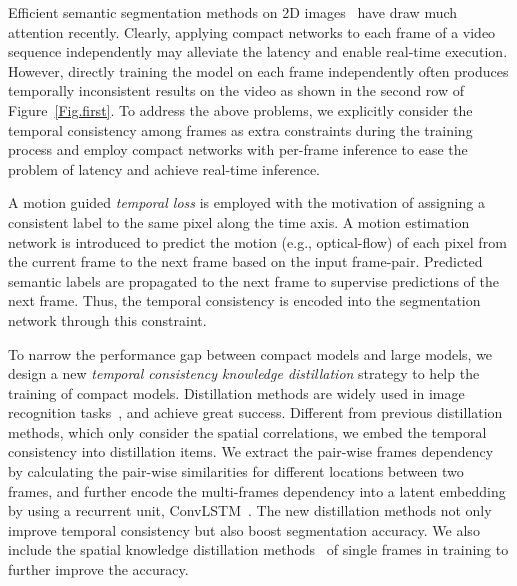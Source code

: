 \documentclass[runningheads]{llncs}
\begin{document}
Efficient semantic segmentation methods on 2D images~\cite{mehta2018espnet,yu2018bisenet,orsic2019defense} have draw much attention recently. Clearly, applying compact networks to each frame of a  video 
sequence independently may alleviate the latency and enable 
real-time execution. However, directly training the model on each frame independently 
often
produces 
temporally 
inconsistent results on the video as shown in the second row of Figure~\ref{Fig.first}. 
To address the above problems, we explicitly consider the temporal consistency among frames as extra constraints during the training process and employ compact networks with per-frame inference to ease the problem of latency and achieve real-time inference. 





A motion guided \textit{temporal loss} is employed with the motivation of assigning a consistent label to the same pixel along the time axis. 
A motion estimation network is introduced to predict the motion (e.g., optical-flow) of each pixel from the current frame to the next frame based on the input frame-pair. Predicted semantic labels are propagated to the next frame to supervise predictions of the next frame. Thus, 
the temporal consistency is encoded into the segmentation network through this constraint. 



To narrow the performance gap between compact models and large models,  we design a new \textit{temporal consistency knowledge distillation} 
strategy 
to help the training of compact models. Distillation methods are widely used in image recognition tasks~\cite{liu2019structured,he2019knowledge,Li2017MimickingVE}, and achieve great success. Different from previous distillation methods,  which only consider the spatial correlations, we embed the temporal consistency into distillation items.  We extract the pair-wise frames dependency by calculating the pair-wise similarities for different locations between two frames, and further encode the multi-frames dependency into a latent embedding by using a recurrent unit, ConvLSTM~\cite{ConvLSTM}. The new distillation methods not only improve temporal consistency but also boost segmentation accuracy.  We also include the spatial knowledge distillation methods~\cite{liu2019structured} of single frames in training to further improve the accuracy.
\end{document}
